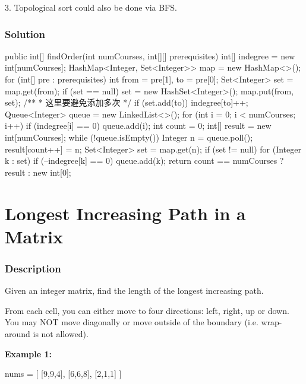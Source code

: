 3. Topological sort could also be done via BFS.

\newpage

\subsubsection{Solution}

\begin{Code}
public int[] findOrder(int numCourses, int[][] prerequisites) {
    int[] indegree = new int[numCourses];
    HashMap<Integer, Set<Integer>> map = new HashMap<>();
    for (int[] pre : prerequisites) {
        int from = pre[1], to = pre[0];
        Set<Integer> set = map.get(from);
        if (set == null) {
            set = new HashSet<Integer>();
            map.put(from, set);
        }
        /**
         * 这里要避免添加多次
         */
        if (set.add(to)) {
            indegree[to]++;
        }
    }
    Queue<Integer> queue = new LinkedList<>();
    for (int i = 0; i < numCourses; i++) {
        if (indegree[i] == 0) {
            queue.add(i);
        }
    }
    int count = 0;
    int[] result = new int[numCourses];
    while (!queue.isEmpty()) {
        Integer n = queue.poll();
        result[count++] = n;
        Set<Integer> set = map.get(n);
        if (set != null) {
            for (Integer k : set) {
                if (--indegree[k] == 0) {
                    queue.add(k);
                }
            }
        }
    }
    return count == numCourses ? result : new int[0];
}
\end{Code}

\newpage

\section{Longest Increasing Path in a Matrix} %

\subsubsection{Description}

Given an integer matrix, find the length of the longest increasing path.

From each cell, you can either move to four directions: left, right, up or down. You may NOT move diagonally or move outside of the boundary (i.e. wrap-around is not allowed).

\textbf{Example 1:}

\begin{Code}
nums = [
  [9,9,4],
  [6,6,8],
  [2,1,1]
]
\end{Code}

